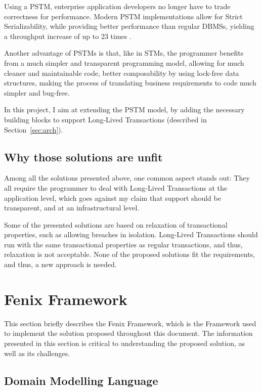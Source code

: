\documentclass{llncs}
\begin{document}
Using a PSTM, enterprise application developers no longer have to
trade correctness for performance. Modern PSTM implementations allow
for Strict Serializability, while providing better performance than
regular DBMSs, yielding a throughput increase of up to 23 times
\cite{fernandes2011strict}.

Another advantage of PSTMs is that, like in STMs, the programmer
benefits from a much simpler and transparent programming model,
allowing for much cleaner and maintainable code, better composability
by using lock-free data structures, making the process of translating
business requirements to code much simpler and bug-free.

In this project, I aim at extending the PSTM model, by adding the
necessary building blocks to support Long-Lived Transactions
(described in Section~\ref{sec:arch}).

\subsection{Why those solutions are unfit}

Among all the solutions presented above, one common aspect stands out:
They all require the programmer to deal with Long-Lived Transactions
at the application level, which goes against my claim that support
should be transparent, and at an infrastructural level.

Some of the presented solutions are based on relaxation of
transactional properties, such as allowing breaches in
isolation. Long-Lived Transactions should run with the same
transactional properties as regular transactions, and thus, relaxation
is not acceptable. None of the proposed solutions fit the
requirements, and thus, a new approach is needed.


\section{Fenix Framework}
\label{chap:ff}

This section briefly describes the Fenix Framework, which is the
Framework used to implement the solution proposed throughout this
document. The information presented in this section is critical to
understanding the proposed solution, as well as its challenges.

\subsection{Domain Modelling Language}
\label{sec:dml}
\end{document}
